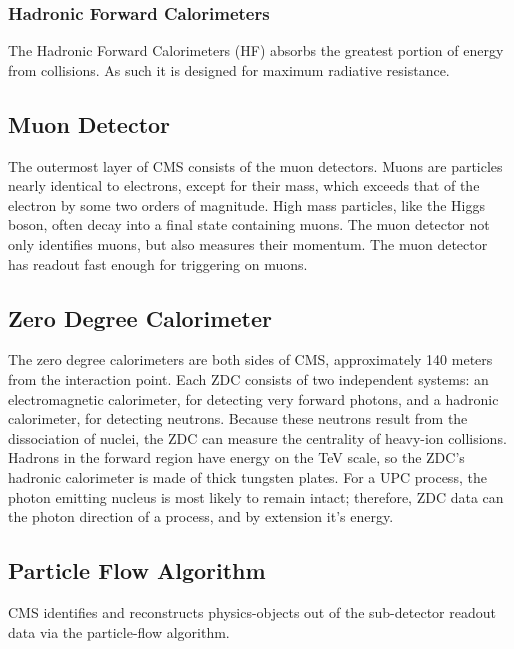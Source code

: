 \subsubsection{Hadronic Forward Calorimeters}

The Hadronic Forward Calorimeters (HF) absorbs the greatest portion of energy from collisions. As such it is designed for maximum radiative resistance.

\subsection{Muon Detector}

The outermost layer of CMS consists of the muon detectors. Muons are particles nearly identical to electrons, except for their mass, which exceeds that of the electron by some two orders of magnitude. High mass particles, like the Higgs boson, often decay into a final state containing muons. The muon detector not only identifies muons, but also measures their momentum. The muon detector has readout fast enough for triggering on muons.

\subsection{Zero Degree Calorimeter}

The zero degree calorimeters are both sides of CMS, approximately 140 meters from the interaction point. Each ZDC consists of two independent systems: an electromagnetic calorimeter, for detecting very forward photons, and a hadronic calorimeter, for detecting neutrons. Because these neutrons result from the dissociation of nuclei, the ZDC can measure the centrality of heavy-ion collisions. Hadrons in the forward region have energy on the TeV scale, so the ZDC's hadronic calorimeter is made of thick tungsten plates. For a UPC process, the photon emitting nucleus is most likely to remain intact; therefore, ZDC data can the photon direction of a process, and by extension it's energy. 

\subsection{Particle Flow Algorithm}

CMS identifies and reconstructs physics-objects out of the sub-detector readout data via the particle-flow algorithm. 

